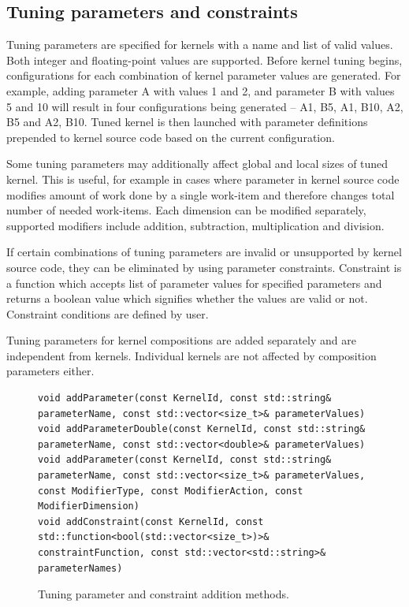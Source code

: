 \documentclass
[
    digital, %
    oneside, %
    table, %
    nolof, %
    nolot, %
    nocover %
]{fithesis3}
\begin{document}
\subsection{Tuning parameters and constraints}
Tuning parameters are specified for kernels with a name and list of valid values. Both integer and floating-point values are supported. Before kernel
tuning begins, configurations for each combination of kernel parameter values are generated. For example, adding parameter A with values 1 and 2, and
parameter B with values 5 and 10 will result in four configurations being generated -- {A1, B5}, {A1, B10}, {A2, B5} and {A2, B10}. Tuned kernel is
then launched with parameter definitions prepended to kernel source code based on the current configuration.

Some tuning parameters may additionally affect global and local sizes of tuned kernel. This is useful, for example in cases where parameter in kernel
source code modifies amount of work done by a single work-item and therefore changes total number of needed work-items. Each dimension can be modified
separately, supported modifiers include addition, subtraction, multiplication and division.

If certain combinations of tuning parameters are invalid or unsupported by kernel source code, they can be eliminated by using parameter constraints.
Constraint is a function which accepts list of parameter values for specified parameters and returns a boolean value which signifies whether the values
are valid or not. Constraint conditions are defined by user.

Tuning parameters for kernel compositions are added separately and are independent from kernels. Individual kernels are not affected by composition
parameters either.

\begin{figure}
\begin{lstlisting}
void addParameter(const KernelId, const std::string& parameterName, const std::vector<size_t>& parameterValues)
void addParameterDouble(const KernelId, const std::string& parameterName, const std::vector<double>& parameterValues)
void addParameter(const KernelId, const std::string& parameterName, const std::vector<size_t>& parameterValues, const ModifierType, const ModifierAction, const ModifierDimension)
void addConstraint(const KernelId, const std::function<bool(std::vector<size_t>)>& constraintFunction, const std::vector<std::string>& parameterNames)
\end{lstlisting}
\caption{Tuning parameter and constraint addition methods.}
\label{ktt-parameter-methods}
\end{figure}
\end{document}

